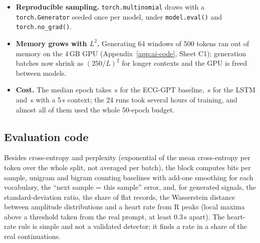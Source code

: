 \begin{itemize}[leftmargin=1.2em,itemsep=1pt]
  \item \textbf{Reproducible sampling.} \texttt{torch.multinomial} draws with a \texttt{torch.Generator}
        seeded once per model, under \texttt{model.eval()} and \texttt{torch.no\_grad()}.
  \item \textbf{Memory grows with $L^2$.} Generating 64 windows of 500 tokens ran out of memory on the
        4\,GB GPU (Appendix~\ref{app:ai-code}, Sheet C1); generation batches now shrink as $(250/L)^2$ for
        longer contexts and the GPU is freed between models.
  \item \textbf{Cost.} The median epoch takes \generativeEpochTimeMedianBase{}\,s for the ECG-GPT
        baseline, \generativeEpochTimeMedianLstm{}\,s for the LSTM and \generativeEpochTimeMedianCtxFiveZeroZero{}\,s
        with a 5\,s context; the 24 runs took several hours of training, and almost all of them used the
        whole 50-epoch budget.
\end{itemize}




\subsection{Evaluation code}

Besides cross-entropy and perplexity (exponential of the mean cross-entropy per token over the whole
split, not averaged per batch), the block computes bits per sample, unigram and bigram counting
baselines with add-one smoothing for each vocabulary, the ``next sample = this sample'' error, and, for
generated signals, the standard-deviation ratio, the share of flat records, the Wasserstein distance
between amplitude distributions and a heart rate from R peaks (local maxima above a threshold taken
from the real prompt, at least 0.3\,s apart). The heart-rate rule is simple and not a validated
detector; it finds a rate in a share \generativeRealHrDefinedFrac{} of the real continuations.
